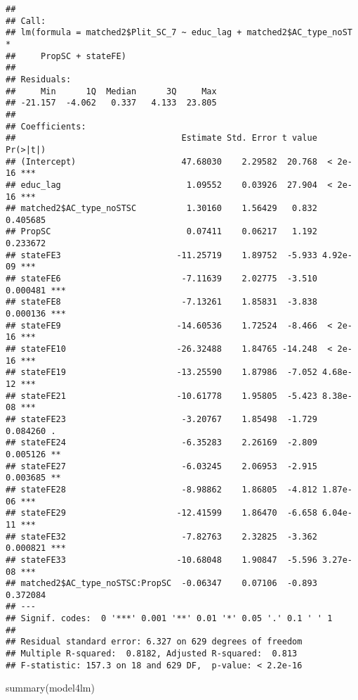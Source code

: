 \documentclass[
]{article}
\newenvironment{Shaded}{\begin{snugshade}}{\end{snugshade}}
\newcommand{\FunctionTok}[1]{\textcolor[rgb]{0.00,0.00,0.00}{#1}}
\newcommand{\NormalTok}[1]{#1}
\begin{document}
\begin{verbatim}
## 
## Call:
## lm(formula = matched2$Plit_SC_7 ~ educ_lag + matched2$AC_type_noST * 
##     PropSC + stateFE)
## 
## Residuals:
##     Min      1Q  Median      3Q     Max 
## -21.157  -4.062   0.337   4.133  23.805 
## 
## Coefficients:
##                                 Estimate Std. Error t value Pr(>|t|)    
## (Intercept)                     47.68030    2.29582  20.768  < 2e-16 ***
## educ_lag                         1.09552    0.03926  27.904  < 2e-16 ***
## matched2$AC_type_noSTSC          1.30160    1.56429   0.832 0.405685    
## PropSC                           0.07411    0.06217   1.192 0.233672    
## stateFE3                       -11.25719    1.89752  -5.933 4.92e-09 ***
## stateFE6                        -7.11639    2.02775  -3.510 0.000481 ***
## stateFE8                        -7.13261    1.85831  -3.838 0.000136 ***
## stateFE9                       -14.60536    1.72524  -8.466  < 2e-16 ***
## stateFE10                      -26.32488    1.84765 -14.248  < 2e-16 ***
## stateFE19                      -13.25590    1.87986  -7.052 4.68e-12 ***
## stateFE21                      -10.61778    1.95805  -5.423 8.38e-08 ***
## stateFE23                       -3.20767    1.85498  -1.729 0.084260 .  
## stateFE24                       -6.35283    2.26169  -2.809 0.005126 ** 
## stateFE27                       -6.03245    2.06953  -2.915 0.003685 ** 
## stateFE28                       -8.98862    1.86805  -4.812 1.87e-06 ***
## stateFE29                      -12.41599    1.86470  -6.658 6.04e-11 ***
## stateFE32                       -7.82763    2.32825  -3.362 0.000821 ***
## stateFE33                      -10.68048    1.90847  -5.596 3.27e-08 ***
## matched2$AC_type_noSTSC:PropSC  -0.06347    0.07106  -0.893 0.372084    
## ---
## Signif. codes:  0 '***' 0.001 '**' 0.01 '*' 0.05 '.' 0.1 ' ' 1
## 
## Residual standard error: 6.327 on 629 degrees of freedom
## Multiple R-squared:  0.8182, Adjusted R-squared:  0.813 
## F-statistic: 157.3 on 18 and 629 DF,  p-value: < 2.2e-16
\end{verbatim}

\begin{Shaded}
\begin{Highlighting}[]
\FunctionTok{summary}\NormalTok{(model4lm)}
\end{Highlighting}
\end{Shaded}
\end{document}
